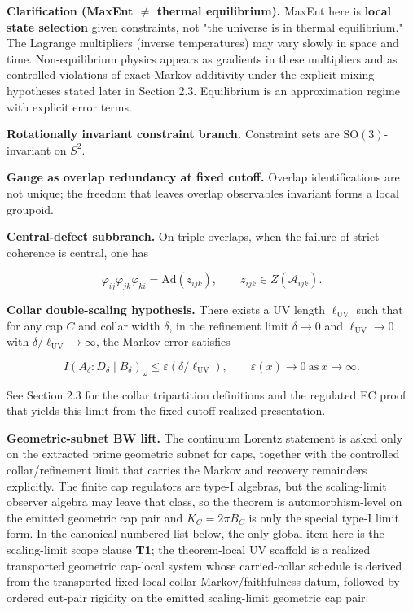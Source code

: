 \textbf{Clarification (MaxEnt \(\neq\) thermal equilibrium).} MaxEnt here is \textbf{local state selection} given constraints, not "the universe is in thermal equilibrium." The Lagrange multipliers (inverse temperatures) may vary slowly in space and time. Non-equilibrium physics appears as gradients in these multipliers and as controlled violations of exact Markov additivity under the explicit mixing hypotheses stated later in Section 2.3. Equilibrium is an approximation regime with explicit error terms.

\textbf{Rotationally invariant constraint branch.} Constraint sets are \(\mathrm{SO}(3)\)-invariant on \(S^2\).

\textbf{Gauge as overlap redundancy at fixed cutoff.} Overlap identifications are not unique; the freedom that leaves overlap observables invariant forms a local groupoid.

\textbf{Central-defect subbranch.} On triple overlaps, when the failure of strict coherence is central, one has

\[
\varphi_{ij} \varphi_{jk} \varphi_{ki} = \mathrm{Ad}(z_{ijk}),\qquad z_{ijk} \in Z(\mathcal{A}_{ijk}).
\]

\textbf{Collar double-scaling hypothesis.} There exists a UV length \(\ell_{\mathrm{UV}}\) such that for any cap \(C\) and collar width \(\delta\), in the refinement limit \(\delta \to 0\) and \(\ell_{\mathrm{UV}} \to 0\) with \(\delta/\ell_{\mathrm{UV}} \to \infty\), the Markov error satisfies

\[
I(A_\delta:D_\delta \mid B_\delta)_\omega \le \varepsilon(\delta/\ell_{\mathrm{UV}}),
\qquad \varepsilon(x) \to 0 \ \text{as} \ x \to \infty.
\]

See Section 2.3 for the collar tripartition definitions and the regulated EC proof that yields this limit from the fixed-cutoff realized presentation.

\textbf{Geometric-subnet BW lift.} The continuum Lorentz statement is asked only on the extracted prime geometric subnet for caps, together with the controlled collar/refinement limit that carries the Markov and recovery remainders explicitly. The finite cap regulators are type-I algebras, but the scaling-limit observer algebra may leave that class, so the theorem is automorphism-level on the emitted geometric cap pair and \(K_C=2\pi B_C\) is only the special type-I limit form. In the canonical numbered list below, the only global item here is the scaling-limit scope clause \textbf{T1}; the theorem-local UV scaffold is a realized transported geometric cap-local system whose carried-collar schedule is derived from the transported fixed-local-collar Markov/faithfulness datum, followed by ordered cut-pair rigidity on the emitted scaling-limit geometric cap pair.

